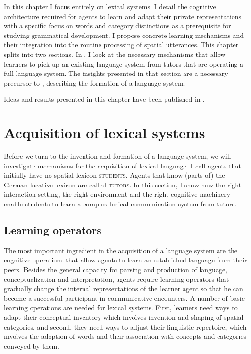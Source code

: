 In this chapter I focus entirely on lexical systems. 
I detail the cognitive architecture required for agents to learn 
and adapt their private representations with a specific
focus on words and category distinctions as a prerequisite 
for studying grammatical development. I propose concrete 
learning mechanisms and their integration into the
routine processing of spatial utterances. This chapter splits into 
two sections. In , I look at the necessary mechanisms that allow 
learners to pick up an existing language system from tutors that 
are operating a full language system. The insights presented in 
that section are a necessary precursor to ,
describing the formation of a language system. 

Ideas and results presented in this chapter have been 
published in \citealt{spranger2012basic,spranger2013acquisition}.

\section{Acquisition of lexical systems}
\label{s:category-acquisition}
Before we turn to the invention and formation of a language system, we will
investigate mechanisms for the acquisition of lexical language. I call agents 
that initially have no spatial lexicon \textsc{students}. 
Agents that know (parts of) the German locative lexicon are called \textsc{tutors}.
In this section, I show how the right interaction setting,
the right environment and the right cognitive machinery enable students to learn 
a complex lexical communication system from tutors.

\subsection{Learning operators}
The most important ingredient in the acquisition of a language system are
the cognitive operations that allow agents to learn an established language
from their peers. Besides the general capacity for parsing and production 
of language, conceptualization and interpretation, 
agents require learning operators that gradually change
the internal representations of the learner agent so that he can become a 
successful participant in communicative encounters. A number of basic learning
operations are needed for lexical systems. First, learners need ways to adapt
their conceptual inventory which involves invention and shaping of spatial categories, 
and second, they need ways to adjust their linguistic repertoire, which involves 
the adoption of words and their association with concepts and categories 
conveyed by them. 

